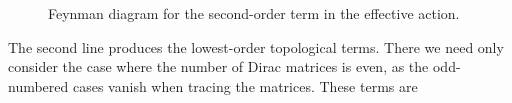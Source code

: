 \begin{figure}[!ht]
	\centering
	\caption{Feynman diagram for the second-order term in the effective action.}
	\label{fig:second_order_fd}
\end{figure}

The second line produces the lowest-order topological terms. There we need only consider the case where the number of Dirac matrices is even, as the odd-numbered cases vanish when tracing the matrices. These terms are
